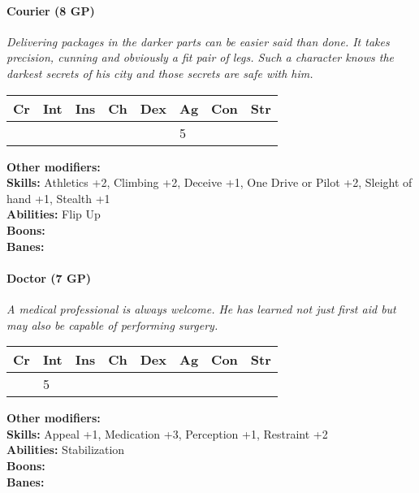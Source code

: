 \paragraph*{Courier (8 GP)}
\textit{Delivering packages in the darker parts can be easier said than done. It takes precision, cunning and obviously a fit pair of legs. Such a character knows the darkest secrets of his city and those secrets are safe with him.}\par
\begin{tabular}{|l|l|l|l|l|l|l|l|}
	\hline
	Cr & Int & Ins & Ch & Dex & Ag & Con & Str \\ \hline
	&  &  &  &  & 5 &  &  \\ \hline
\end{tabular}\par
\noindent\textbf{Other modifiers:} \\
\textbf{Skills:} Athletics +2,
Climbing +2,
Deceive +1,
One Drive or Pilot +2,
Sleight of hand +1,
Stealth +1\\
\textbf{Abilities:} Flip Up\\
\textbf{Boons:} \\
\textbf{Banes:} \\

\hrulefill
\paragraph*{Doctor (7 GP)}
\textit{A medical professional is always welcome. He has learned not just first aid but may also be capable of performing surgery.}\par
\begin{tabular}{|l|l|l|l|l|l|l|l|}
	\hline
	Cr & Int & Ins & Ch & Dex & Ag & Con & Str \\ \hline
	& 5 &  &  &  &  &  &  \\ \hline
\end{tabular}\par
\noindent\textbf{Other modifiers:} \\
\textbf{Skills:} Appeal +1,
Medication +3,
Perception +1,
Restraint +2\\
\textbf{Abilities:} Stabilization\\
\textbf{Boons:} \\
\textbf{Banes:} \\

\hrulefill
